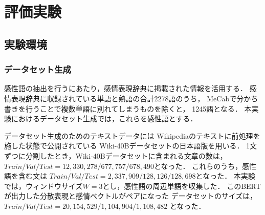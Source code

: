 \chapter{評価実験}

\label{chap:evaluation}

\section{実験環境}
	\subsection{データセット生成}
		感性語の抽出を行うにあたり，感情表現辞典に掲載された情報を活用する．
		感情表現辞典に収録されている単語と熟語の合計2278語のうち，
		MeCabで分かち書きを行うことで複数単語に別れてしまうものを除くと，
		1245語となる．
		本実験におけるデータセット生成では，これらを感性語とする．

		データセット生成のためのテキストデータには
		Wikipediaのテキストに前処理を施した状態で公開されている
		Wiki-40Bデータセットの日本語版を用いる．
		1文ずつに分割したとき，Wiki-40Bデータセットに含まれる文章の数は，
		$Train/Val/Test=12,330,278/677,757/678,490$となった．
		これらのうち，感性語を含む文は
		$Train/Val/Test=2,337,909/128,126/128,698$となった．
		本実験では，ウィンドウサイズ$W=3$とし，感性語の周辺単語を収集した．
		このBERTが出力した分散表現と感情ベクトルがペアになった
		データセットのサイズは，
		$Train/Val/Test=20,154,529/1,104,904/1,108,482$
		となった．

